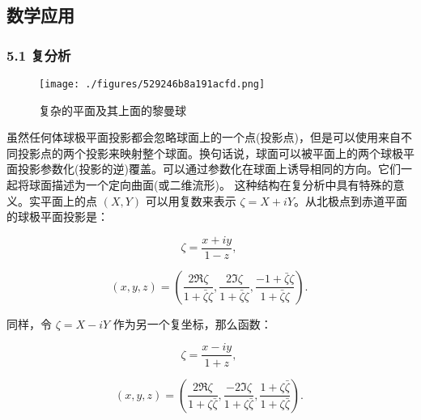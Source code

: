\subsection{数学应用}
\subsubsection{5.1 复分析}
\begin{figure}[ht]
\centering
\texttt{[image: ./figures/529246b8a191acfd.png]}
\caption{复杂的平面及其上面的黎曼球} \label{fig_QJPMTY_17}
\end{figure}
虽然任何体球极平面投影都会忽略球面上的一个点(投影点)，但是可以使用来自不同投影点的两个投影来映射整个球面。换句话说，球面可以被平面上的两个球极平面投影参数化(投影的逆)覆盖。可以通过参数化在球面上诱导相同的方向。它们一起将球面描述为一个定向曲面(或二维流形)。
这种结构在复分析中具有特殊的意义。实平面上的点 $(X, Y)$ 可以用复数来表示 $\zeta = X + iY$。从北极点到赤道平面的球极平面投影是：

$$\zeta = \frac{x + iy}{1 - z},~$$

$$(x, y, z) = \left( \frac{2 \Re \zeta}{1 + \bar{\zeta}\zeta }, \frac{2 \Im \zeta}{1 + \bar{\zeta}\zeta }, \frac{-1 + \bar{\zeta}\zeta }{1 + \bar{\zeta}\zeta } \right).~$$

同样，令 $\zeta = X - iY$ 作为另一个复坐标，那么函数：

$$\zeta = \frac{x - iy}{1 + z},~$$

$$(x, y, z) = \left( \frac{2 \Re \zeta}{1 + \zeta \bar{\zeta}}, \frac{-2 \Im \zeta}{1 + \zeta \bar{\zeta}}, \frac{1 + \zeta \bar{\zeta}}{1 + \zeta \bar{\zeta}} \right).~$$